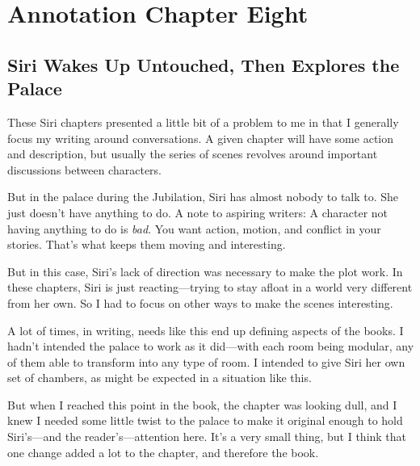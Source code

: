 \section{Annotation Chapter Eight}

\subsection*{Siri Wakes Up Untouched, Then Explores the Palace}

These Siri chapters presented a little bit of a problem to me in that I generally focus my writing around conversations. A given chapter will have some action and description, but usually the series of scenes revolves around important discussions between characters.

But in the palace during the Jubilation, Siri has almost nobody to talk to. She just doesn’t have anything to do. A note to aspiring writers: A character not having anything to do is \textit{bad}. You want action, motion, and conflict in your stories. That’s what keeps them moving and interesting.

But in this case, Siri’s lack of direction was necessary to make the plot work. In these chapters, Siri is just reacting—trying to stay afloat in a world very different from her own. So I had to focus on other ways to make the scenes interesting.

A lot of times, in writing, needs like this end up defining aspects of the books. I hadn’t intended the palace to work as it did—with each room being modular, any of them able to transform into any type of room. I intended to give Siri her own set of chambers, as might be expected in a situation like this.

But when I reached this point in the book, the chapter was looking dull, and I knew I needed some little twist to the palace to make it original enough to hold Siri’s—and the reader’s—attention here. It’s a very small thing, but I think that one change added a lot to the chapter, and therefore the book.



